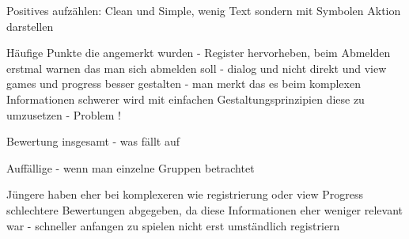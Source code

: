 			Positives aufzählen: Clean und Simple, wenig Text sondern mit Symbolen Aktion darstellen
			
			Häufige Punkte die angemerkt wurden - Register hervorheben, beim Abmelden erstmal warnen das man sich abmelden soll - dialog und nicht direkt und view games und progress besser gestalten - man merkt das es beim komplexen Informationen schwerer wird mit einfachen Gestaltungsprinzipien diese zu umzusetzen - Problem !

			Bewertung insgesamt - was fällt auf
			
			Auffällige - wenn man einzelne Gruppen betrachtet 
			
			Jüngere haben eher bei komplexeren wie registrierung oder view Progress schlechtere Bewertungen abgegeben, da diese Informationen eher weniger relevant war - schneller anfangen zu spielen nicht erst umständlich registriern 
			